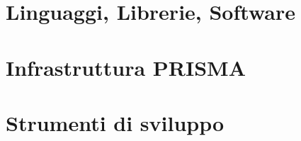 \section{Linguaggi, Librerie, Software} \label{software}


\section{Infrastruttura PRISMA} \label{infrastruttura-PRISMA}


\section{Strumenti di sviluppo} 
